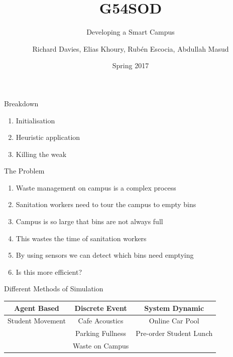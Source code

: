 \documentclass[18pt]{beamer}
\title{G54SOD}
\subtitle{Developing a Smart Campus}
\date{Spring 2017}
\author{Richard Davies, Elias Khoury, Rub\'{e}n Escocia, Abdullah Masud}
\institute{The University of Nottingham}
\begin{document}
    \graphicspath{ {images/} }
    \maketitle

    \begin{frame}{Breakdown}
        \begin{enumerate}
            \item Initialisation
            \item Heuristic application
            \item Killing the weak
        \end{enumerate}
    \end{frame}


    \begin{frame}{The Problem}
        \begin{enumerate}
            \item Waste management on campus is a complex process \pause
            \item Sanitation workers need to tour the campus to empty bins \pause
            \item Campus is so large that bins are not always full \pause
            \item This wastes the time of sanitation workers \pause
            \item By using sensors we can detect which bins need emptying \pause
            \item Is this more efficient?
        \end{enumerate}
    \end{frame}

    \begin{frame}{Different Methods of Simulation}
        \begin{centering} 
            \begin{tabular}{| c | c | c |}
                \hline
                Agent Based      & Discrete Event  & System Dynamic \\
                \hline
                \pause
                Student Movement & Cafe Acoustics    & Online Car Pool \\ \pause
                                 & Parking Fullness  & Pre-order Student Lunch \\ \pause
                                 & Waste on Campus   & \\
        
                \hline

            \end{tabular}
        \end{centering}
    \end{frame}
\end{document}
